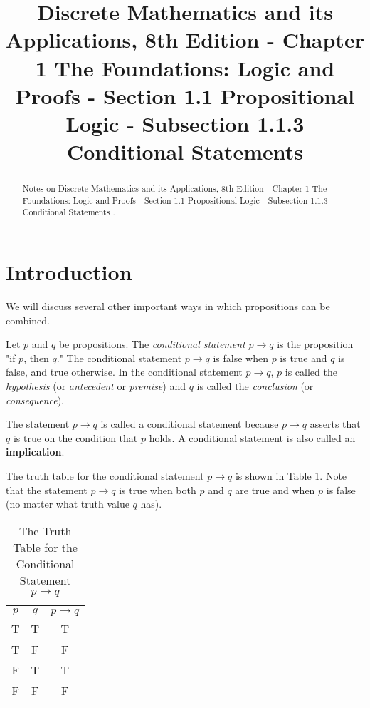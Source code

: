 \documentclass{Axon}
\title{Discrete Mathematics and its Applications, 8th Edition - Chapter 1 The Foundations: Logic and Proofs - Section 1.1 Propositional Logic - Subsection 1.1.3 Conditional Statements}
\begin{document}
\maketitle
\makeauthor
\begin{abstract}
Notes on Discrete Mathematics and its Applications, 8th Edition - Chapter 1 The Foundations: Logic and Proofs - Section 1.1 Propositional Logic - Subsection 1.1.3 Conditional Statements \cite{Rosen}.
\end{abstract}
\section{Introduction}
We will discuss several other important ways in which propositions can be combined.

\begin{definition}
    Let \(p\) and \(q\) be propositions. The \textit{conditional statement} \(p \to q\) is the proposition "if \(p\), then \(q\)." The conditional statement \(p \to q\) is false when \(p\) is true and \(q\) is false, and true otherwise. In the conditional statement \(p \to q\), \(p\) is called the \textit{hypothesis} (or \textit{antecedent} or \textit{premise}) and \(q\) is called the \textit{conclusion} (or \textit{consequence}).
\end{definition}

The statement \(p \to q\) is called a conditional statement because \(p \to q\) asserts that \(q\) is true on the condition that \(p\) holds. A conditional statement is also called an \textbf{implication}.

The truth table for the conditional statement \(p \to q\) is shown in Table \ref{Table: 5}. Note that the statement \(p \to q\) is true when both \(p\) and \(q\) are true and when \(p\) is false (no matter what truth value \(q\) has).

\begin{table}[h]
    \centering
    \begin{tabular}{c|c|c}
        \(p\) & \(q\) & \(p \to q\) \\
        T     & T     & T \\
        T     & F     & F \\
        F     & T     & T \\
        F     & F     & F \\
    \end{tabular}
    \caption{The Truth Table for the Conditional Statement \(p \to q\)}
    \label{Table: 5}
\end{table}
\end{document}
